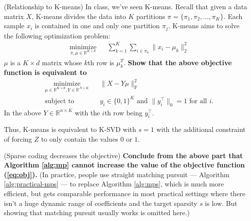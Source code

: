 \begin{Parts}
\Part (Relationship to K-means) In class, we've seen K-means. Recall that given a data matrix $X$, K-means divides the data into $K$ partitions $\pi=\{\pi_1,\pi_2,\dots,\pi_K\}$. Each sample $x_i$ is contained in one and only one partition $\pi_j$. K-means aims to solve the following optimization problem: 
\begin{equation}
\label{eq:obj_kmeans}
\begin{aligned}
& \underset{\pi,\mu\in\mathbb R^{K\times d}}{\text{minimize}}
& & \sum_{k=1}^K\sum_{i\in\pi_k}\|x_i-\mu_k\|_2^2 
\end{aligned}
\end{equation}
$\mu$ is a $K\times d$ matrix whose $k$th row is $\mu_k^T$. {\bf Show that the above objective function is equivalent to }
\begin{equation}
\label{eq:obj1}
\begin{aligned}
& \underset{\mu\in\mathbb R^{K\times d}, Y\in\mathbb R^{N\times K}}{\text{minimize}}
& & \|X-Y\mu\|_{\text{F}}^2\\
& \text{subject to}
& & y_i\in\{0,1\}^K  \text{ and }\|y_i^\top \|_0= 1  \text{ for all $i$}.
\end{aligned}
\end{equation}
In the above $Y \in \mathbb R^{n\times K}$ with the $i$th row being $y_i^\top$.

Thus, K-means is equivalent to K-SVD with $s=1$ with the additional
constraint of forcing $Z$ to only contain the values $0$ or $1$. 

 




\Part (Sparse coding decreases the objective) {\bf Conclude from the above
part that Algorithm \ref{alg:mp} cannot increase the value of the objective
function (\ref{eq:obj}).} (In practice, people use straight matching
pursuit --- Algorithm \ref{alg:practical-mps} --- to replace Algorithm \ref{alg:mps}, which is
much more efficient, but gets comparable performance in most practical
settings where there isn't a huge dynamic range of coefficients and
the target sparsity $s$ is low. But showing that matching pursuit usually works is omitted here.)


\end{Parts}
